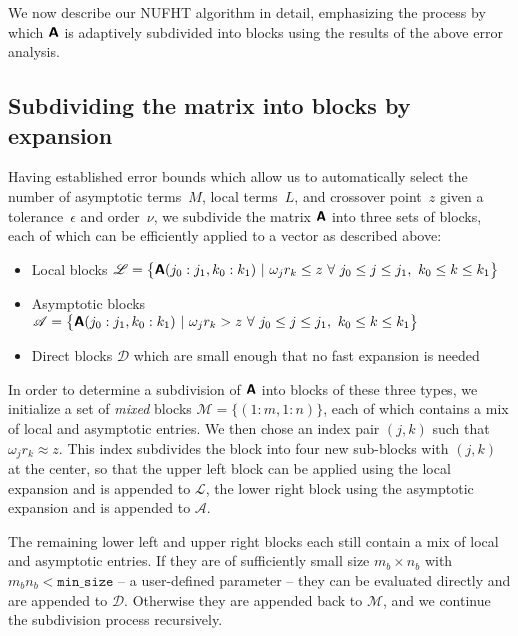 
We now describe our NUFHT algorithm in detail, emphasizing the process by which
$\bm{\mathsf{A}}$ is adaptively subdivided into blocks using the results of the above
error analysis.




\subsection{Subdividing the matrix into blocks by expansion}

Having established error bounds which allow us to automatically select the
number of asymptotic terms~$M$, local terms~$L$, and crossover point~$z$ given a
tolerance~$\epsilon$ and order~$\nu$, we subdivide the matrix $\bm{\mathsf{A}}$ into
three sets of blocks, each of which can be efficiently applied to a vector as
described above:
\begin{itemize}
    \item Local blocks $\mathscr{L} = \big\{ \bm{\mathsf{A}}(j_0:j_1, k_0:k_1) \ | \ \omega_j
    r_k \leq z \ \forall \ j_0 \leq j \leq j_1, \ k_0 \leq k \leq k_1 \big\}$
    \item Asymptotic blocks $\mathscr{A} = \big\{ \bm{\mathsf{A}}(j_0:j_1, k_0:k_1) \ | \
    \omega_j r_k > z \ \forall \ j_0 \leq j \leq j_1, \ k_0 \leq k \leq k_1
    \big\}$
    \item Direct blocks $\mathscr{D}$ which are small enough that no fast
    expansion is needed
\end{itemize}


In order to determine a subdivision of $\bm{\mathsf{A}}$ into blocks of these three
types, we initialize a set of \textit{mixed} blocks $\mathscr{M} = \{(1:m,
1:n)\}$, each of which contains a mix of local and asymptotic entries. We then
chose an index pair $(j,k)$ such that $\omega_j r_k \approx z$. This index
subdivides the block into four new sub-blocks with $(j,k)$ at the center, so
that the upper left block can be applied using the local expansion and is
appended to $\mathscr{L}$, the lower right block using the asymptotic expansion
and is appended to $\mathscr{A}$. 

The remaining lower left and upper right blocks each still contain a mix of
local and asymptotic entries. If they are of sufficiently small size $m_b \times
n_b$ with $m_b n_b < \texttt{min\_size}$ -- a user-defined parameter --
they can be evaluated directly and are
appended to $\mathscr{D}$. Otherwise they are appended back to $\mathscr{M}$,
and we continue the subdivision process recursively. 

